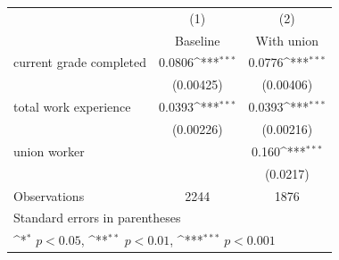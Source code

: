 {
\def\sym#1{\ifmmode^{#1}\else\(^{#1}\)\fi}
\begin{tabular}{l*{2}{c}}
\toprule
                    &\multicolumn{1}{c}{(1)}&\multicolumn{1}{c}{(2)}\\
                    &\multicolumn{1}{c}{Baseline}&\multicolumn{1}{c}{With union}\\
\midrule
current grade completed&      0.0806\sym{***}&      0.0776\sym{***}\\
                    &   (0.00425)         &   (0.00406)         \\
\addlinespace
total work experience&      0.0393\sym{***}&      0.0393\sym{***}\\
                    &   (0.00226)         &   (0.00216)         \\
\addlinespace
union worker        &                     &       0.160\sym{***}\\
                    &                     &    (0.0217)         \\
\midrule
Observations        &        2244         &        1876         \\
\bottomrule
\multicolumn{3}{l}{\footnotesize Standard errors in parentheses}\\
\multicolumn{3}{l}{\footnotesize \sym{*} \(p<0.05\), \sym{**} \(p<0.01\), \sym{***} \(p<0.001\)}\\
\end{tabular}
}
